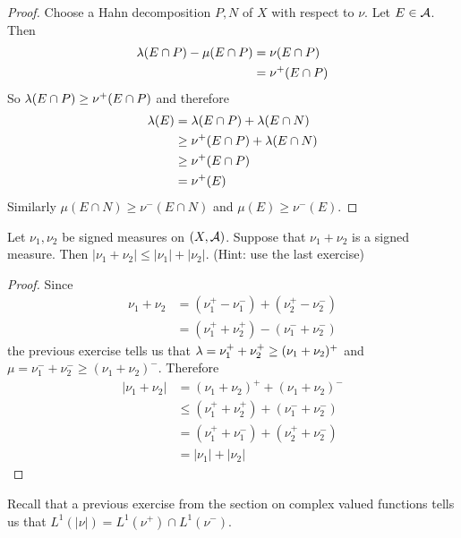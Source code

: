 \documentclass{book}
\begin{document}
	\begin{proof}
		Choose a Hahn decomposition $P,N$ of $X$ with respect to $\nu$. Let $E \in \mathcal{A}$. Then 
		\begin{align*}
			\lambda(E \cap P) - \mu(E \cap P) 
			&= \nu(E \cap P)\\
			&= \nu^+(E \cap P)
		\end{align*}
		So $\lambda(E \cap P) \geq  \nu^+(E \cap P) $ and therefore 
		\begin{align*}
			\lambda(E) 
			&= \lambda(E \cap P) + \lambda(E \cap N)\\
			& \geq \nu^+(E \cap P) + \lambda (E \cap N)\\
			& \geq \nu^+(E \cap P)\\
			& = \nu^+(E)
		\end{align*} 
		Similarly $\mu(E \cap N) \geq \nu^-(E \cap N)$ and $\mu(E) \geq \nu^-(E)$.
	\end{proof}
	
	\begin{ex}  
		Let $\nu_1, \nu_2$ be signed measures on $(X, \mathcal{A})$. Suppose that $\nu_1 + \nu_2$ is a signed measure. Then $|\nu_1 + \nu_2| \leq |\nu_1|+ |\nu_2|$. (Hint: use the last exercise)
	\end{ex}
	
	\begin{proof}
		Since 
		\begin{align*}
			\nu_1 + \nu_2 
			&= (\nu_1^+ - \nu_1^-) + (\nu_2^+ - \nu_2^-)\\
			&= (\nu_1^+ + \nu_2^+) - (\nu_1^- + \nu_2^-)
		\end{align*}
		the previous exercise tells us that $\lambda = \nu_1^+ + \nu_2^+ \geq (\nu_1 + \nu_2)^+$ and $ \mu = \nu_1^- + \nu_2^- \geq (\nu_1 + \nu_2)^-$. Therefore 
		\begin{align*}
			|\nu_1 + \nu_2| 
			&= (\nu_1 + \nu_2)^+  + (\nu_1 + \nu_2)^-\\
			& \leq (\nu_1^+ + \nu_2^+) + (\nu_1^- + \nu_2^-)\\
			&= (\nu_1^+ + \nu_1^-) + (\nu_2^+ + \nu_2^-)\\
			&= |\nu_1| + |\nu_2|
		\end{align*}
	\end{proof}
	
	\begin{note}
		Recall that a previous exercise from the section on complex valued functions tells us that $L^1(|\nu|) = L^1(\nu^+) \cap L^1(\nu^-)$.
	\end{note}
	
\end{document}

